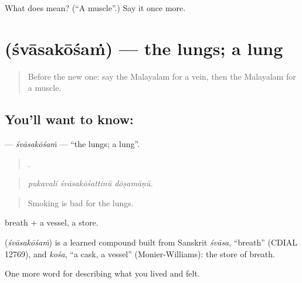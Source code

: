 \begin{tcolorbox}[breakable,colback=teal!4,colframe=teal!35!black,title={Before you move on}]
What does  mean? (\textquotedblleft{}A muscle\textquotedblright{}.) Say it once more.
\end{tcolorbox}
\section[\texorpdfstring{\ml{ശ്വാസകോശം} (śvāsakōśaṁ)}{ശ്വാസകോശം (śvāsakōśaṁ)}]{ (śvāsakōśaṁ) — the lungs; a lung}

\label{lesson:ML-C536-svasakosam}



\begin{quote}
Before the new one: say the Malayalam for a vein, then the Malayalam for a muscle.
\end{quote}

\subsection*{You'll want to know: }
\textbf{} — \emph{śvāsakōśaṁ} — \textquotedblleft{}the lungs; a lung\textquotedblright{}.

\begin{quote}
  .
\end{quote}

\begin{quote}
\emph{pukavali śvāsakōśattinŭ dōṣamāṇŭ.}
\end{quote}

\begin{quote}
Smoking is bad for the lungs.
\end{quote}

 breath +  a vessel, a store.

\begin{cousinweb}
\textbf{} (\emph{śvāsakōśaṁ}) is a learned compound built from Sanskrit \emph{śvāsa}, \textquotedblleft{}breath\textquotedblright{} (CDIAL 12769), and \emph{kośa}, \textquotedblleft{}a cask, a vessel\textquotedblright{} (Monier-Williams): the store of breath.
\end{cousinweb}

\begin{grammarlens}[title={What you've built}]
One more word for describing what you lived and felt.
\end{grammarlens}

